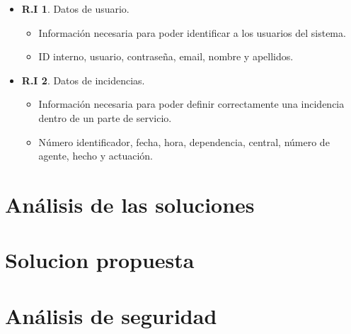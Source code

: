 \begin{itemize}
	\item \textbf{R.I 1}. Datos de usuario.
	\begin{itemize}
		\item Información necesaria para poder identificar a los usuarios del sistema.
		\item ID interno, usuario, contraseña, email, nombre y apellidos.
	\end{itemize}

	\item \textbf{R.I 2}. Datos de incidencias.
	\begin{itemize}
		\item Información necesaria para poder definir correctamente una incidencia dentro de un parte de servicio.
		\item Número identificador, fecha, hora, dependencia, central, número de agente, hecho y actuación.
	\end{itemize}
\end{itemize}

\section{Análisis de las soluciones}

\section{Solucion propuesta}

\section{Análisis de seguridad}
